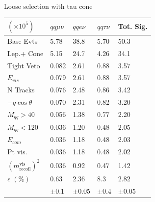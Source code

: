 \begin{table}

\begin{minipage}{0.49\linewidth}
\scriptsize
\quad \quad \\
Loose selection with tau cone\\
 \begin{tabular}{|p{}|p{}p{}p{}|p{}|}
\hline 
 $(\times 10^5) $ & $qq\mu\nu$  & $qqe\nu$ & $qq\tau\nu$ & Tot. Sig.\\ \hline 
Base Evts &{5.78 } & {38.8 } & {5.70} & 50.3\\ 
 
Lep.+ Cone &{5.15 } & {24.7 } & {4.26} & 34.1\\ 

Tight Veto &{0.082 } & {2.61 } & {0.88} & 3.57\\ 

$E_{vis}$ &{0.079 } & {2.61 } & {0.88} & 3.57\\ 

N Tracks &{0.076 } & {2.48 } & {0.86} & 3.42\\ 

$-q\cos\theta$ &{0.070 } & {2.31 } & {0.82} & 3.20\\ 
 
$M_{qq} > 40$ &{0.056 } & {1.38 } & {0.77} & 2.20\\ 

$M_{qq} < 120$ &{0.036 } & {1.20 } & {0.48} & 2.05\\ 
 
$E_{com}$ &{0.036 } & {1.18 } & {0.48} & 2.03\\ 
 
Pt vis. &{0.036 } & {1.18 } & {0.48 }& 2.02\\ 

$(m^{\text{vis}}_{\text{recoil}})^2$ &{0.036 } & {0.92 } & {0.47} & 1.42\\ 
\hline 
 $\epsilon \, \, (\%)$ & $0.63 $ & $2.36$ & $8.3$ & $2.82$\\ 
  			& $\pm 0.1$ & $\pm 0.05$ & $\pm 0.4$ & $\pm 0.05$\\  
 \hline
 \end{tabular}

\end{minipage}
\label{tab:os}
 \end{table}


